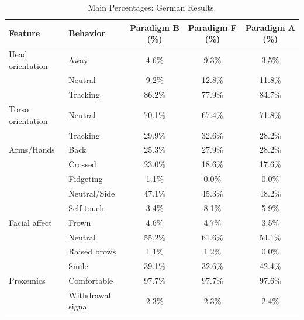 \begin{table}[ht]
\centering
\begin{tabular}{llccc}
\toprule
Feature & Behavior & Paradigm B (\%) & Paradigm F (\%) & Paradigm A (\%) \\
\midrule
Head orientation & Away & 4.6\% & 9.3\% & 3.5\% \\
~ & Neutral & 9.2\% & 12.8\% & 11.8\% \\
~ & Tracking & 86.2\% & 77.9\% & 84.7\% \\
\midrule
Torso orientation & Neutral & 70.1\% & 67.4\% & 71.8\% \\
~ & Tracking & 29.9\% & 32.6\% & 28.2\% \\
\midrule
Arms/Hands & Back & 25.3\% & 27.9\% & 28.2\% \\
~ & Crossed & 23.0\% & 18.6\% & 17.6\% \\
~ & Fidgeting & 1.1\% & 0.0\% & 0.0\% \\
~ & Neutral/Side & 47.1\% & 45.3\% & 48.2\% \\
~ & Self-touch & 3.4\% & 8.1\% & 5.9\% \\
\midrule
Facial affect & Frown & 4.6\% & 4.7\% & 3.5\% \\
~ & Neutral & 55.2\% & 61.6\% & 54.1\% \\
~ & Raised brows & 1.1\% & 1.2\% & 0.0\% \\
~ & Smile & 39.1\% & 32.6\% & 42.4\% \\
\midrule
Proxemics & Comfortable & 97.7\% & 97.7\% & 97.6\% \\
~ & Withdrawal signal & 2.3\% & 2.3\% & 2.4\% \\
\bottomrule
\end{tabular}
\caption{Main Percentages: German Results.}
\label{tab:main_pct_german}
\end{table}

